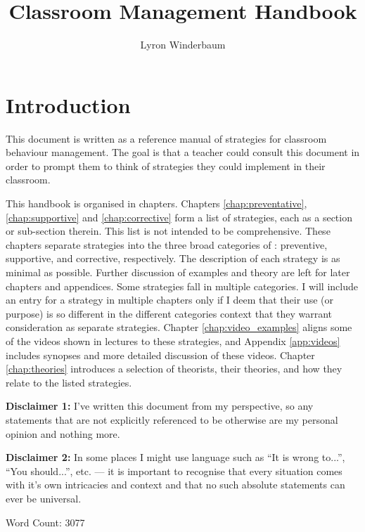 \documentclass[12pt]{report}
\title{Classroom Management Handbook}
\author{Lyron Winderbaum}
\begin{document}
\maketitle

\tableofcontents

\chapter{Introduction}

This document is written as a reference manual of strategies for classroom behaviour management. The goal is that a teacher could consult this document in order to prompt them to think of strategies they could implement in their classroom.

This handbook is organised in chapters. Chapters \ref{chap:preventative}, \ref{chap:supportive} and \ref{chap:corrective} form a list of strategies, each as a section or sub-section therein.
This list is not intended to be comprehensive. These chapters separate strategies into the three broad categories of \cite{Charles2002}: preventive, supportive, and corrective, respectively. The description of each strategy is as minimal as possible. Further discussion of examples and theory are left for later chapters and appendices. Some strategies fall in multiple categories. I will include an entry for a strategy in multiple chapters only if I deem that their use (or purpose) is so different in the different categories context that they warrant consideration as separate strategies. Chapter \ref{chap:video_examples} aligns some of the videos shown in lectures to these strategies, and Appendix \ref{app:videos} includes synopses and more detailed discussion of these videos. Chapter \ref{chap:theories} introduces a selection of theorists, their theories, and how they relate to the listed strategies.

\textbf{Disclaimer 1:} I've written this document from my perspective, so any statements that are not explicitly referenced to be otherwise are my personal opinion and nothing more.

\textbf{Disclaimer 2:} In some places I might use language such as ``It is wrong to...'', ``You should...'', etc. --- it is important to recognise that every situation comes with it's own intricacies and context and that no such absolute statements can ever be universal.

\hfill Word Count: 3077\footnotemark 

\end{document}
